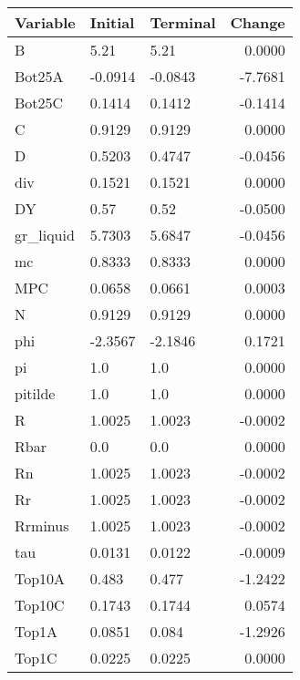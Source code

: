 \begin{table}
\centering
\label{tab:stst_comparison_low_beta_limit_permanent}
\begin{tabular}{lllr}
\toprule
                Variable & Initial & Terminal &  Change \\
\midrule
                       B &    5.21 &     5.21 &  0.0000 \\
                  Bot25A & -0.0914 &  -0.0843 & -7.7681 \\
                  Bot25C &  0.1414 &   0.1412 & -0.1414 \\
                       C &  0.9129 &   0.9129 &  0.0000 \\
                       D &  0.5203 &   0.4747 & -0.0456 \\
                     div &  0.1521 &   0.1521 &  0.0000 \\
                      DY &    0.57 &     0.52 & -0.0500 \\
               gr\_liquid &  5.7303 &   5.6847 & -0.0456 \\
                      mc &  0.8333 &   0.8333 &  0.0000 \\
                     MPC &  0.0658 &   0.0661 &  0.0003 \\
                       N &  0.9129 &   0.9129 &  0.0000 \\
                     phi & -2.3567 &  -2.1846 &  0.1721 \\
                      pi &     1.0 &      1.0 &  0.0000 \\
                 pitilde &     1.0 &      1.0 &  0.0000 \\
                       R &  1.0025 &   1.0023 & -0.0002 \\
                    Rbar &     0.0 &      0.0 &  0.0000 \\
                      Rn &  1.0025 &   1.0023 & -0.0002 \\
                      Rr &  1.0025 &   1.0023 & -0.0002 \\
                 Rrminus &  1.0025 &   1.0023 & -0.0002 \\
                     tau &  0.0131 &   0.0122 & -0.0009 \\
                  Top10A &   0.483 &    0.477 & -1.2422 \\
                  Top10C &  0.1743 &   0.1744 &  0.0574 \\
                   Top1A &  0.0851 &    0.084 & -1.2926 \\
                   Top1C &  0.0225 &   0.0225 &  0.0000 \\

\end{tabular}
\end{table}
